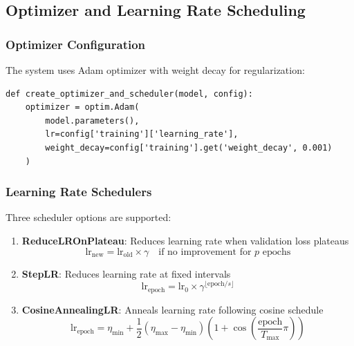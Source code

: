 \documentclass[11pt,a4paper]{article}
\begin{document}
\subsection{Optimizer and Learning Rate Scheduling}

\subsubsection{Optimizer Configuration}

The system uses Adam optimizer with weight decay for regularization:

\begin{lstlisting}[caption={Optimizer Setup (lines 380-439)}]
def create_optimizer_and_scheduler(model, config):
    optimizer = optim.Adam(
        model.parameters(),
        lr=config['training']['learning_rate'],
        weight_decay=config['training'].get('weight_decay', 0.001)
    )
\end{lstlisting}

\subsubsection{Learning Rate Schedulers}

Three scheduler options are supported:

\begin{enumerate}
    \item \textbf{ReduceLROnPlateau}: Reduces learning rate when validation loss plateaus
    \begin{equation}
    \text{lr}_{\text{new}} = \text{lr}_{\text{old}} \times \gamma \quad \text{if no improvement for } p \text{ epochs}
    \end{equation}

    \item \textbf{StepLR}: Reduces learning rate at fixed intervals
    \begin{equation}
    \text{lr}_{\text{epoch}} = \text{lr}_0 \times \gamma^{\lfloor \text{epoch} / s \rfloor}
    \end{equation}

    \item \textbf{CosineAnnealingLR}: Anneals learning rate following cosine schedule
    \begin{equation}
    \text{lr}_{\text{epoch}} = \eta_{\min} + \frac{1}{2}(\eta_{\max} - \eta_{\min})\left(1 + \cos\left(\frac{\text{epoch}}{T_{\max}}\pi\right)\right)
    \end{equation}
\end{enumerate}
\end{document}
